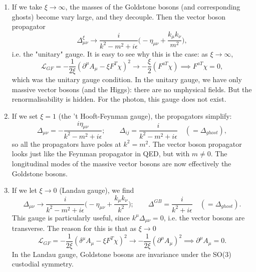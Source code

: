 \documentclass[a4paper,12pt]{article}
\begin{document}
\begin{enumerate}
\item If we take $\xi \to \infty$, the masses of the Goldstone bosons (and corresponding ghosts) become vary large, and they decouple. Then the vector boson propagator
\begin{equation}
\Delta_{\mu \nu}^\xi \to \frac{i}{k^2 - m^2 + i \epsilon} \bigg(-\eta_{\mu \nu} + \frac{k_\mu k_\nu}{m^2} \bigg),
\end{equation}
i.e. the "unitary" gauge. It is easy to see why this is the case: as $\xi \to \infty$,
\begin{equation}
\mathcal{L}_{GF} = - \frac{1}{2\xi}(\partial^\mu A_\mu - \xi F^T \chi)^2 \to - \frac{\xi}{2}(F^{a T}\chi) \implies F^{aT}\chi = 0,
\end{equation}
which was the unitary gauge condition. In the unitary gauge, we have only massive vector bosons (and the Higgs): there are no unphysical fields. But the renormalisability is hidden. For the photon, this gauge does not exist.
\item If we set $\xi = 1$ (the 't Hooft-Feynman gauge), the propagators simplify:
\begin{equation}
\Delta_{\mu\nu} = - \frac{i\eta_{\mu \nu}}{k^2 - m^2 + i\epsilon}; \qquad \Delta_{ij} = \frac{i}{k^2-m^2 + i\epsilon} \quad (= \Delta_{ghost}),
\end{equation}
so all the propagators have poles at $k^2=m^2$. The vector boson propagator looks just like the Feynman propagator in QED, but with $m \neq 0$. The longitudinal modes of the massive vector bosons are now effectively the Goldstone bosons.
\item If we let $\xi \to 0$ (Landau gauge), we find
\begin{equation}
\Delta_{\mu \nu} \to \frac{i}{k^2 -m^2 + i\epsilon} \bigg(-\eta_{\mu \nu} + \frac{k_\mu k_\nu}{k^2}\bigg); \qquad \Delta^{GB} = \frac{i}{k^2 + i\epsilon} \quad (= \Delta_{ghost}).
\end{equation}
This gauge is particularly useful, since $k^\mu \Delta_{\mu \nu} = 0$, i.e. the vector bosons are transverse. The reason for this is that as $\xi \to 0$
\begin{equation}
\mathcal{L}_{GF} = - \frac{1}{2\xi}(\delta^\mu A_\mu - \xi F^T \chi)^2 \to -\frac{1}{2\xi}(\partial^\mu A_\mu)^2 \implies \partial^\mu A_\mu = 0.
\end{equation}
In the Landau gauge, Goldstone bosons are invariance under the SO(3) custodial symmetry.
\end{enumerate}
\end{document}
